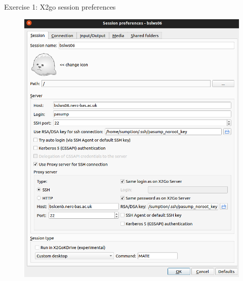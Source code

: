 \documentclass[handout]{beamer} %
\begin{document}
{
%
\begin{frame}{Exercise 1: X2go session preferences }
\begin{minipage}{0.5\textwidth}
\begin{figure}[H]
\includegraphics[scale=0.2]{x2g0-bslws06-prefs.png}

\end{figure}
\end{minipage}
\end{frame}}
\end{document}
